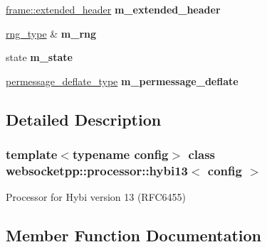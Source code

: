 \begin{DoxyCompactItemize}
\mbox{\hyperlink{structwebsocketpp_1_1frame_1_1extended__header}{frame\+::extended\+\_\+header}} {\bfseries m\+\_\+extended\+\_\+header}
\item 
\mbox{\label{classwebsocketpp_1_1processor_1_1hybi13_a3e6ee5afc8a635c0a410f678bda8ea84}} 
\mbox{\hyperlink{classwebsocketpp_1_1random_1_1none_1_1int__generator}{rng\+\_\+type}} \& {\bfseries m\+\_\+rng}
\item 
\mbox{\label{classwebsocketpp_1_1processor_1_1hybi13_a4660c14a2a241a2439fb3aa497ab5886}} 
state {\bfseries m\+\_\+state}
\item 
\mbox{\label{classwebsocketpp_1_1processor_1_1hybi13_a9103ac43ba28b3b3e5cedf519b1c67c5}} 
\mbox{\hyperlink{classwebsocketpp_1_1extensions_1_1permessage__deflate_1_1disabled}{permessage\+\_\+deflate\+\_\+type}} {\bfseries m\+\_\+permessage\+\_\+deflate}
\end{DoxyCompactItemize}


\subsection{Detailed Description}
\subsubsection*{template$<$typename config$>$\newline
class websocketpp\+::processor\+::hybi13$<$ config $>$}

Processor for Hybi version 13 (R\+F\+C6455) 

\subsection{Member Function Documentation}
\mbox{\label{classwebsocketpp_1_1processor_1_1hybi13_a587360571f5bb11b7d0c39b69566bf38}} 
